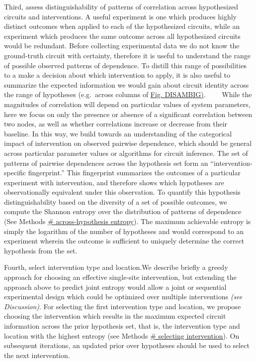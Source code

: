 \documentclass{article}
\begin{document}
Third, assess distinguishability of patterns of correlation across hypothesized circuits and interventions. A useful experiment is one which produces highly distinct outcomes when applied to each of the hypothesized circuits, while an experiment which produces the same outcome across all hypothesized circuits would be redundant. Before collecting experimental data we do not know the ground-truth circuit with certainty, therefore it is useful to understand the range of possible observed patterns of dependence. To distill this range of possibilities to a make a decision about which intervention to apply, it is also useful to summarize the expected information we would gain about circuit identity across the range of hypotheses (e.g.~across columns of
\protect\hyperlink{fig-disambig}{Fig. DISAMBIG)}. ~~~~While the magnitudes of correlation will depend on particular values of system parameters, here we focus on only the presence or absence of a significant correlation between two nodes, as well as whether correlations increase or decrease from their baseline. In this way, we build towards an understanding of the categorical impact of intervention on observed pairwise dependence, which should be general across particular parameter values or algorithms for circuit inference. The set of patterns of pairwise dependences across the hypothesis set form an
``intervention-specific fingerprint.'' This fingerprint summarizes the outcomes of a particular experiment with intervention, and therefore shows which hypotheses are observationally equivalent under this observation. To quantify this hypothesis distinguishability based on the diversity of a set of possible outcomes, we compute the Shannon entropy over the distribution of patterns of dependence (See Methods
\href{/section_content/methods_entropy.md}{\# across-hypothesis entropy}). The maximum achievable entropy is simply the logarithm of the number of hypotheses and would correspond to an experiment wherein the outcome is sufficient to uniquely determine the correct hypothesis from the set.

Fourth, select intervention type and location.We describe briefly a greedy approach for choosing an effective single-site intervention, but extending the approach above to predict joint entropy would allow a joint or sequential experimental design which could be optimized over multiple interventions \emph{(see Discussion)}. For selecting the first intervention type and location, we propose choosing the intervention which results in the maximum expected circuit information across the prior hypothesis set, that is, the intervention type and location with the highest entropy (see Methods
\href{/section_content/methods_entropy_selection.md}{\# selecting intervention}). On subsequent iterations, an updated prior over hypotheses should be used to select the next intervention.
\end{document}
